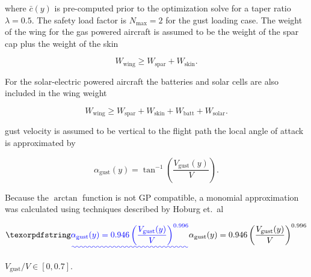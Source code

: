 where $\bar{c}(y)$ is pre-computed prior to the optimization solve for a taper ratio $\lambda = 0.5$. The safety load factor is $N_{\text{max}}=2$ for the gust loading case. The weight of the wing for the gas powered aircraft is assumed to be the weight of the spar cap plus the weight of the skin 

\begin{equation}
    W_{\text{wing}} \geq W_{\text{spar}} + W_{\text{skin}}.
\end{equation}

For the solar-electric powered aircraft the batteries and solar cells are also included in the wing weight

\begin{equation}
    W_{\text{wing}} \geq W_{\text{spar}} + W_{\text{skin}} + W_{\text{batt}} + W_{\text{solar}}.
\end{equation}

\DIFdelbegin {}\DIFdelend \DIFaddbegin {}\DIFaddend gust velocity is assumed to be vertical to the flight path \DIFdelbegin \DIFdel{, }\DIFdelend \DIFaddbegin {}\DIFaddend the local angle of attack is approximated by 

\begin{equation}
    \label{e:gustalpha}
    \alpha_{\text{gust}}(y)  = \tan^{-1}\left(\frac{V_{\text{gust}}(y)}{V} \right).
\end{equation}

Because the $\arctan$ function is not GP compatible, a monomial approximation was calculated using techniques described by Hoburg et.~al\cite{fitting}\DIFdelbegin {}\DIFdelend \DIFaddbegin \DIFadd{,
}

\begin{equation}
    \DIFadd{\alpha_{\text{gust}}(y)  = 0.946 \left(\frac{V_{\text{gust}}(y)}{V} \right)^{0.996}
}\end{equation}

\DIFaddend $V_{\text{gust}}/V \in [0, 0.7]$.

\DIFdelbegin %
{%
\textbf{}%
}

